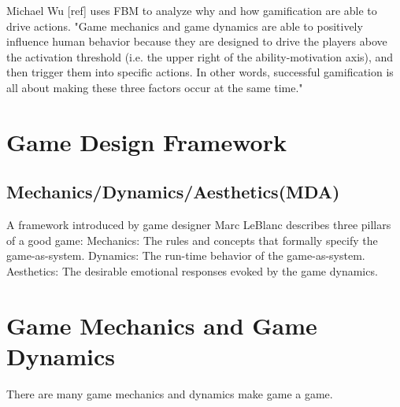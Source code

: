 Michael Wu [ref] uses FBM to analyze why and how gamification are able to drive actions. 
"Game mechanics and game dynamics are able to positively influence human behavior because they are designed to drive the players above the activation threshold (i.e. the upper right of the ability-motivation axis), and then trigger them into specific actions. In other words, successful gamification is all about making these three factors occur at the same time."

\section{Game Design Framework}
\subsection{Mechanics/Dynamics/Aesthetics(MDA)}
A framework introduced by game designer Marc LeBlanc describes three pillars of a good game:
Mechanics: The rules and concepts that formally specify the game-as-system.
Dynamics: The run-time behavior of the game-as-system.
Aesthetics: The desirable emotional responses evoked by the game dynamics.

\section{Game Mechanics and Game Dynamics}
There are many game mechanics and dynamics make game a game. 

